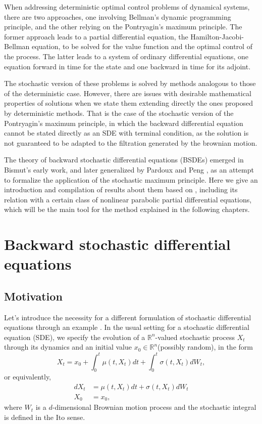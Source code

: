 \newcommand{\Sspa}{\mathbb{S}^2(0,T)}
\newcommand{\Hspa}{\mathbb{H}^2(0,T)^d}

When addressing deterministic optimal control problems of dynamical systems, there are two approaches, one involving Bellman's dynamic programming principle, and the other relying on the Pontryagin's maximum principle. The former approach leads to a partial differential equation, the Hamilton-Jacobi-Bellman equation, to be solved for the value function and the optimal control of the process. The latter leads to a system of ordinary differential equations, one equation forward in time for the state and one backward in time for its adjoint.

The stochastic version of these problems is solved by methods analogous to those of the deterministic case. However, there are issues with desirable mathematical properties of solutions when we state them extending directly the ones proposed by deterministic methods. That is the case of the stochastic version of the Pontryagin's maximum principle, in which the backward differential equation cannot be stated directly as an SDE with terminal condition, as the solution is not guaranteed to be adapted to the filtration generated by the brownian motion.

The theory of backward stochastic differential equations (BSDEs) emerged in Bismut's \cite{bismut_conjugate_1973} early work, and later generalized by Pardoux and Peng \cite{pardoux_adapted_1990}, as an attempt to formalize the application of the stochastic maximum principle. Here we give an introduction and compilation of results about them based on \cite{zhang_backward_2017,pardoux_stochastic_2014,romero_maestro_nodate,touzi_optimal_2013}, including its relation with a certain class of nonlinear parabolic partial differential equations, which will be the main tool for the method explained in the following chapters. 
\section{Backward stochastic differential equations}
\subsection{Motivation}
Let's introduce the necessity for a different formulation of stochastic differential equations through an example \cite{romero_maestro_nodate}. In the usual setting for a stochastic differential equation (SDE), we specify the evolution of a $\mathbb{R}^n$-valued stochastic process $X_t$ through its dynamics and an initial value $x_0\in \mathbb{R}^n$(possibly random), in the form
\begin{equation}
	X_t=x_0 +\int_{0}^{t}\mu(t,X_t)dt+\int_{0}^{t} \sigma(t,X_t) dW_t,
\end{equation}
or equivalently,
\begin{equation}
	\label{eqn:SDE}
	\begin{split}
		dX_t&=\mu(t,X_t)dt+\sigma(t,X_t)dW_t\\
		X_0&=x_0,
	\end{split}
\end{equation}
where $W_t$ is a $d$-dimensional Brownian motion process and the stochastic integral is defined in the Ito sense.

